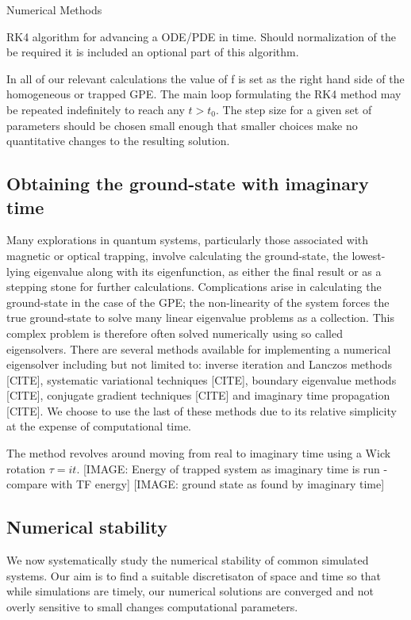 \begin{chapter}{\label{cha:numerics}Numerical Methods}
\begin{algorithm}[H]
{			
		}
	\caption{RK4 algorithm for advancing a ODE/PDE in time. Should normalization of the be required it is included an optional part of this algorithm.}\label{algo_rk4}
	\end{algorithm}

	In all of our relevant calculations the value of f is set as the right hand side of the homogeneous or trapped GPE. The main loop formulating the RK4 method may be repeated indefinitely to reach any $t>t_0$. The step size for a given set of parameters should be chosen small enough that smaller choices make no quantitative changes to the resulting solution.

	\subsection{\label{section:imagTime} Obtaining the ground-state with imaginary time}
	Many explorations in quantum systems, particularly those associated with magnetic or optical trapping,  involve calculating the ground-state, the lowest-lying eigenvalue along with its eigenfunction, as either the final result or as a stepping stone for further calculations. Complications arise in calculating the ground-state in the case of the GPE; the non-linearity of the system forces the true ground-state to solve many linear eigenvalue problems as a collection.	This complex problem is therefore often solved numerically using so called eigensolvers. There are several methods available for implementing a numerical eigensolver including but not limited to: inverse iteration and Lanczos methods [CITE], systematic variational techniques [CITE], boundary eigenvalue methods [CITE], conjugate gradient techniques [CITE] and imaginary time propagation [CITE]. We choose to use the last of these methods due to its relative simplicity at the expense of computational time.

	The method revolves around moving from real to imaginary time using a Wick rotation $\tau = it$.
	[IMAGE: Energy of trapped system as imaginary time is run - compare with TF energy]
	[IMAGE: ground state as found by imaginary time]



	\subsection{\label{section:numericalParams} Numerical stability}
	We now systematically study the numerical stability of common simulated systems. Our aim is to find a suitable discretisaton of space and time so that while simulations are timely, our numerical solutions are converged and not overly sensitive to small changes computational parameters.


\end{chapter}
